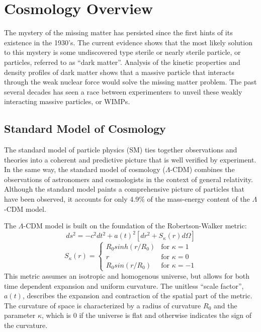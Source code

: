 \chapter{Cosmology Overview}
The mystery of the missing matter has persisted since the first hints of its existence in the 1930's. The current evidence shows that the most likely solution to this mystery is some undiscovered type sterile or nearly sterile particle, or particles, referred to as ``dark matter''. Analysis of the kinetic properties and density profiles of dark matter shows that a massive particle that interacts through the weak nuclear force would solve the missing matter problem. The past several decades has seen a race between experimenters to unveil these weakly interacting massive particles, or WIMPs. 

\section{Standard Model of Cosmology}
The standard model of particle physics (SM) ties together observations and theories into a coherent and predictive picture that is well verified by experiment. In the same way, the standard model of cosmology ($\Lambda$-CDM) combines the observations of astronomers and cosmologists in the context of general relativity. Although the standard model paints a comprehensive picture of particles that have been observed, it accounts for only 4.9\%\cite{planck2015} of the mass-energy content of the $\Lambda$-CDM model. 

The $\Lambda$-CDM model is built on the foundation of the Robertson-Walker metric:
\begin{equation} \label{eq:rwmetric}
ds^2 = -c^2dt^2+a(t)^2 \left[ dr^2 +S_{\kappa}(r)d\Omega \right]
\end{equation}
\begin{equation}\label{eq:rwcurvature}
S_{\kappa}(r)=
\begin{cases}
R_0sinh(r/R_0) & \text{for } \kappa = 1 \\
r                        & \text{for } \kappa = 0 \\
R_0sin(r/R_0)   & \text{for } \kappa = -1
\end{cases}
\end{equation}
This metric assumes an isotropic and homogenous universe, but allows for both time dependent expansion and uniform curvature. The unitless ``scale factor'', $a(t)$, describes the expansion and contraction of the spatial part of the metric. The curvature of space is characterized by a radius of curvature $R_0$ and the parameter $\kappa$, which is 0 if the universe is flat and otherwise indicates the sign of the curvature.

